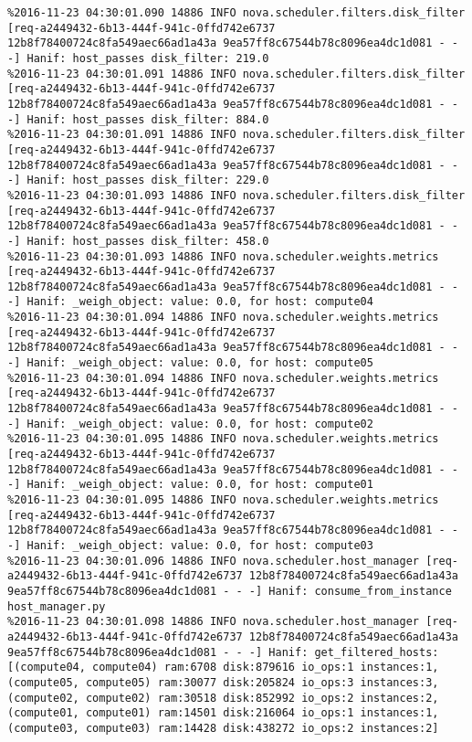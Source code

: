 \begin{lstlisting}[frame=single, caption={The filter scheduler log trace for 10 virtual instances}, label={lst:filterschedulercodetracelog10vi}, escapechar=|]
%2016-11-23 04:30:01.090 14886 INFO nova.scheduler.filters.disk_filter [req-a2449432-6b13-444f-941c-0ffd742e6737 12b8f78400724c8fa549aec66ad1a43a 9ea57ff8c67544b78c8096ea4dc1d081 - - -] Hanif: host_passes disk_filter: 911.0
%2016-11-23 04:30:01.090 14886 INFO nova.scheduler.filters.disk_filter [req-a2449432-6b13-444f-941c-0ffd742e6737 12b8f78400724c8fa549aec66ad1a43a 9ea57ff8c67544b78c8096ea4dc1d081 - - -] Hanif: host_passes disk_filter: 219.0
%2016-11-23 04:30:01.091 14886 INFO nova.scheduler.filters.disk_filter [req-a2449432-6b13-444f-941c-0ffd742e6737 12b8f78400724c8fa549aec66ad1a43a 9ea57ff8c67544b78c8096ea4dc1d081 - - -] Hanif: host_passes disk_filter: 884.0
%2016-11-23 04:30:01.091 14886 INFO nova.scheduler.filters.disk_filter [req-a2449432-6b13-444f-941c-0ffd742e6737 12b8f78400724c8fa549aec66ad1a43a 9ea57ff8c67544b78c8096ea4dc1d081 - - -] Hanif: host_passes disk_filter: 229.0
%2016-11-23 04:30:01.093 14886 INFO nova.scheduler.filters.disk_filter [req-a2449432-6b13-444f-941c-0ffd742e6737 12b8f78400724c8fa549aec66ad1a43a 9ea57ff8c67544b78c8096ea4dc1d081 - - -] Hanif: host_passes disk_filter: 458.0
%2016-11-23 04:30:01.093 14886 INFO nova.scheduler.weights.metrics [req-a2449432-6b13-444f-941c-0ffd742e6737 12b8f78400724c8fa549aec66ad1a43a 9ea57ff8c67544b78c8096ea4dc1d081 - - -] Hanif: _weigh_object: value: 0.0, for host: compute04
%2016-11-23 04:30:01.094 14886 INFO nova.scheduler.weights.metrics [req-a2449432-6b13-444f-941c-0ffd742e6737 12b8f78400724c8fa549aec66ad1a43a 9ea57ff8c67544b78c8096ea4dc1d081 - - -] Hanif: _weigh_object: value: 0.0, for host: compute05
%2016-11-23 04:30:01.094 14886 INFO nova.scheduler.weights.metrics [req-a2449432-6b13-444f-941c-0ffd742e6737 12b8f78400724c8fa549aec66ad1a43a 9ea57ff8c67544b78c8096ea4dc1d081 - - -] Hanif: _weigh_object: value: 0.0, for host: compute02
%2016-11-23 04:30:01.095 14886 INFO nova.scheduler.weights.metrics [req-a2449432-6b13-444f-941c-0ffd742e6737 12b8f78400724c8fa549aec66ad1a43a 9ea57ff8c67544b78c8096ea4dc1d081 - - -] Hanif: _weigh_object: value: 0.0, for host: compute01
%2016-11-23 04:30:01.095 14886 INFO nova.scheduler.weights.metrics [req-a2449432-6b13-444f-941c-0ffd742e6737 12b8f78400724c8fa549aec66ad1a43a 9ea57ff8c67544b78c8096ea4dc1d081 - - -] Hanif: _weigh_object: value: 0.0, for host: compute03
%2016-11-23 04:30:01.096 14886 INFO nova.scheduler.host_manager [req-a2449432-6b13-444f-941c-0ffd742e6737 12b8f78400724c8fa549aec66ad1a43a 9ea57ff8c67544b78c8096ea4dc1d081 - - -] Hanif: consume_from_instance host_manager.py
%2016-11-23 04:30:01.098 14886 INFO nova.scheduler.host_manager [req-a2449432-6b13-444f-941c-0ffd742e6737 12b8f78400724c8fa549aec66ad1a43a 9ea57ff8c67544b78c8096ea4dc1d081 - - -] Hanif: get_filtered_hosts: [(compute04, compute04) ram:6708 disk:879616 io_ops:1 instances:1, (compute05, compute05) ram:30077 disk:205824 io_ops:3 instances:3, (compute02, compute02) ram:30518 disk:852992 io_ops:2 instances:2, (compute01, compute01) ram:14501 disk:216064 io_ops:1 instances:1, (compute03, compute03) ram:14428 disk:438272 io_ops:2 instances:2]

\end{lstlisting}
